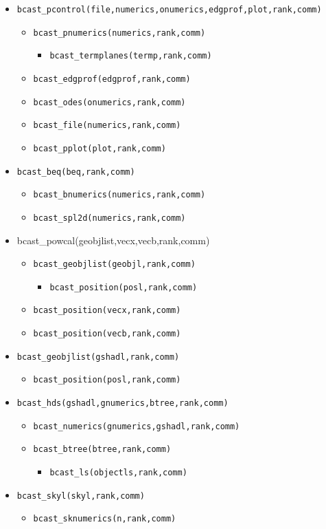 \label{loc:bcast}
\begin{itemize}
\item {\tt bcast\_pcontrol(file,numerics,onumerics,edgprof,plot,rank,comm)}
  \begin{itemize}
    \item{\tt bcast\_pnumerics(numerics,rank,comm)}
      \begin{itemize}
      \item{\tt bcast\_termplanes(termp,rank,comm)}
      \end{itemize}
    \item{\tt bcast\_edgprof(edgprof,rank,comm)}
    \item{\tt bcast\_odes(onumerics,rank,comm)}
    \item{\tt bcast\_file(numerics,rank,comm)}
    \item{\tt bcast\_pplot(plot,rank,comm)}       
  \end{itemize}
\item {\tt bcast\_beq(beq,rank,comm)}
  \begin{itemize}
  \item{\tt bcast\_bnumerics(numerics,rank,comm)}
  \item{\tt bcast\_spl2d(numerics,rank,comm)}
  \end{itemize}
\item{bcast\_powcal(geobjlist,vecx,vecb,rank,comm)}
  \begin{itemize}
  \item{\tt bcast\_geobjlist(geobjl,rank,comm)}
    \begin{itemize}
    \item{\tt bcast\_position(posl,rank,comm)}
    \end{itemize}
  \item{\tt bcast\_position(vecx,rank,comm)}
  \item{\tt bcast\_position(vecb,rank,comm)}
  \end{itemize}
\item{\tt bcast\_geobjlist(gshadl,rank,comm)}
  \begin{itemize}
  \item{\tt bcast\_position(posl,rank,comm)}
  \end{itemize}
\item{\tt bcast\_hds(gshadl,gnumerics,btree,rank,comm)}
  \begin{itemize}
  \item{\tt bcast\_numerics(gnumerics,gshadl,rank,comm)}
  \item{\tt bcast\_btree(btree,rank,comm)}
    \begin{itemize}
    \item{\tt bcast\_ls(objectls,rank,comm)}
    \end{itemize}      
  \end{itemize}
\item{\tt bcast\_skyl(skyl,rank,comm)}
  \begin{itemize}
    \item{\tt bcast\_sknumerics(n,rank,comm)}
  \end{itemize}
\end{itemize}

